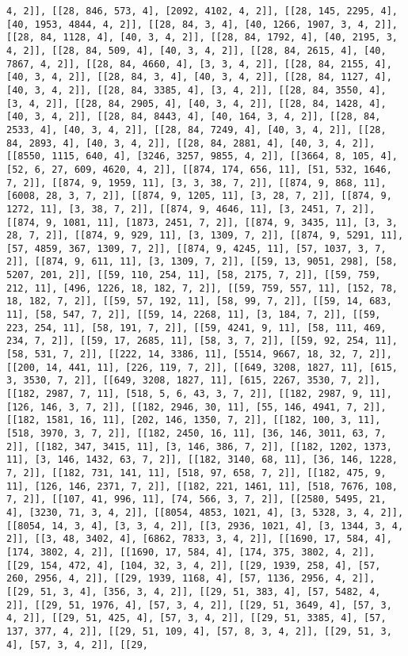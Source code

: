 \documentclass[12pt,fleqn]{article}\usepackage{../../common}
\begin{document}
\begin{verbatim}
4, 2]], [[28, 846, 573, 4], [2092, 4102, 4, 2]], [[28, 145, 2295, 4], [40, 1953, 4844, 4, 2]], [[28, 84, 3, 4], [40, 1266, 1907, 3, 4, 2]], [[28, 84, 1128, 4], [40, 3, 4, 2]], [[28, 84, 1792, 4], [40, 2195, 3, 4, 2]], [[28, 84, 509, 4], [40, 3, 4, 2]], [[28, 84, 2615, 4], [40, 7867, 4, 2]], [[28, 84, 4660, 4], [3, 3, 4, 2]], [[28, 84, 2155, 4], [40, 3, 4, 2]], [[28, 84, 3, 4], [40, 3, 4, 2]], [[28, 84, 1127, 4], [40, 3, 4, 2]], [[28, 84, 3385, 4], [3, 4, 2]], [[28, 84, 3550, 4], [3, 4, 2]], [[28, 84, 2905, 4], [40, 3, 4, 2]], [[28, 84, 1428, 4], [40, 3, 4, 2]], [[28, 84, 8443, 4], [40, 164, 3, 4, 2]], [[28, 84, 2533, 4], [40, 3, 4, 2]], [[28, 84, 7249, 4], [40, 3, 4, 2]], [[28, 84, 2893, 4], [40, 3, 4, 2]], [[28, 84, 2881, 4], [40, 3, 4, 2]], [[8550, 1115, 640, 4], [3246, 3257, 9855, 4, 2]], [[3664, 8, 105, 4], [52, 6, 27, 609, 4620, 4, 2]], [[874, 174, 656, 11], [51, 532, 1646, 7, 2]], [[874, 9, 1959, 11], [3, 3, 38, 7, 2]], [[874, 9, 868, 11], [6008, 28, 3, 7, 2]], [[874, 9, 1205, 11], [3, 28, 7, 2]], [[874, 9, 1272, 11], [3, 38, 7, 2]], [[874, 9, 4646, 11], [3, 2451, 7, 2]], [[874, 9, 1081, 11], [1873, 2451, 7, 2]], [[874, 9, 3435, 11], [3, 3, 28, 7, 2]], [[874, 9, 929, 11], [3, 1309, 7, 2]], [[874, 9, 5291, 11], [57, 4859, 367, 1309, 7, 2]], [[874, 9, 4245, 11], [57, 1037, 3, 7, 2]], [[874, 9, 611, 11], [3, 1309, 7, 2]], [[59, 13, 9051, 298], [58, 5207, 201, 2]], [[59, 110, 254, 11], [58, 2175, 7, 2]], [[59, 759, 212, 11], [496, 1226, 18, 182, 7, 2]], [[59, 759, 557, 11], [152, 78, 18, 182, 7, 2]], [[59, 57, 192, 11], [58, 99, 7, 2]], [[59, 14, 683, 11], [58, 547, 7, 2]], [[59, 14, 2268, 11], [3, 184, 7, 2]], [[59, 223, 254, 11], [58, 191, 7, 2]], [[59, 4241, 9, 11], [58, 111, 469, 234, 7, 2]], [[59, 17, 2685, 11], [58, 3, 7, 2]], [[59, 92, 254, 11], [58, 531, 7, 2]], [[222, 14, 3386, 11], [5514, 9667, 18, 32, 7, 2]], [[200, 14, 441, 11], [226, 119, 7, 2]], [[649, 3208, 1827, 11], [615, 3, 3530, 7, 2]], [[649, 3208, 1827, 11], [615, 2267, 3530, 7, 2]], [[182, 2987, 7, 11], [518, 5, 6, 43, 3, 7, 2]], [[182, 2987, 9, 11], [126, 146, 3, 7, 2]], [[182, 2946, 30, 11], [55, 146, 4941, 7, 2]], [[182, 1581, 16, 11], [202, 146, 1350, 7, 2]], [[182, 100, 3, 11], [518, 3970, 3, 7, 2]], [[182, 2450, 16, 11], [36, 146, 3011, 63, 7, 2]], [[182, 347, 3415, 11], [3, 146, 386, 7, 2]], [[182, 1202, 1373, 11], [3, 146, 1432, 63, 7, 2]], [[182, 3140, 68, 11], [36, 146, 1228, 7, 2]], [[182, 731, 141, 11], [518, 97, 658, 7, 2]], [[182, 475, 9, 11], [126, 146, 2371, 7, 2]], [[182, 221, 1461, 11], [518, 7676, 108, 7, 2]], [[107, 41, 996, 11], [74, 566, 3, 7, 2]], [[2580, 5495, 21, 4], [3230, 71, 3, 4, 2]], [[8054, 4853, 1021, 4], [3, 5328, 3, 4, 2]], [[8054, 14, 3, 4], [3, 3, 4, 2]], [[3, 2936, 1021, 4], [3, 1344, 3, 4, 2]], [[3, 48, 3402, 4], [6862, 7833, 3, 4, 2]], [[1690, 17, 584, 4], [174, 3802, 4, 2]], [[1690, 17, 584, 4], [174, 375, 3802, 4, 2]], [[29, 154, 472, 4], [104, 32, 3, 4, 2]], [[29, 1939, 258, 4], [57, 260, 2956, 4, 2]], [[29, 1939, 1168, 4], [57, 1136, 2956, 4, 2]], [[29, 51, 3, 4], [356, 3, 4, 2]], [[29, 51, 383, 4], [57, 5482, 4, 2]], [[29, 51, 1976, 4], [57, 3, 4, 2]], [[29, 51, 3649, 4], [57, 3, 4, 2]], [[29, 51, 425, 4], [57, 3, 4, 2]], [[29, 51, 3385, 4], [57, 137, 377, 4, 2]], [[29, 51, 109, 4], [57, 8, 3, 4, 2]], [[29, 51, 3, 4], [57, 3, 4, 2]], [[29, 
\end{verbatim}
\end{document}
